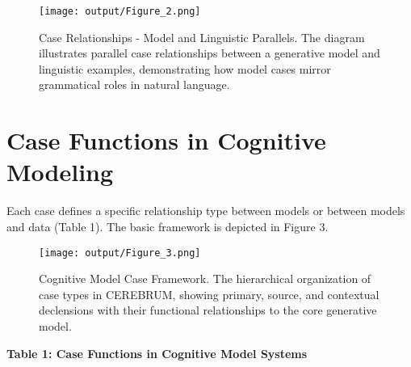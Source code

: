 \begin{figure}
\centering
\texttt{[image: output/Figure\_2.png]}
\caption{Case Relationships - Model and Linguistic Parallels. The
diagram illustrates parallel case relationships between a generative
model and linguistic examples, demonstrating how model cases mirror
grammatical roles in natural language.}
\end{figure}

\hypertarget{case-functions-in-cognitive-modeling}{%
\section{Case Functions in Cognitive
Modeling}\label{case-functions-in-cognitive-modeling}}

Each case defines a specific relationship type between models or between
models and data (Table 1). The basic framework is depicted in Figure 3.

\begin{figure}
\centering
\texttt{[image: output/Figure\_3.png]}
\caption{Cognitive Model Case Framework. The hierarchical organization
of case types in CEREBRUM, showing primary, source, and contextual
declensions with their functional relationships to the core generative
model.}
\end{figure}

\textbf{Table 1: Case Functions in Cognitive Model Systems}

